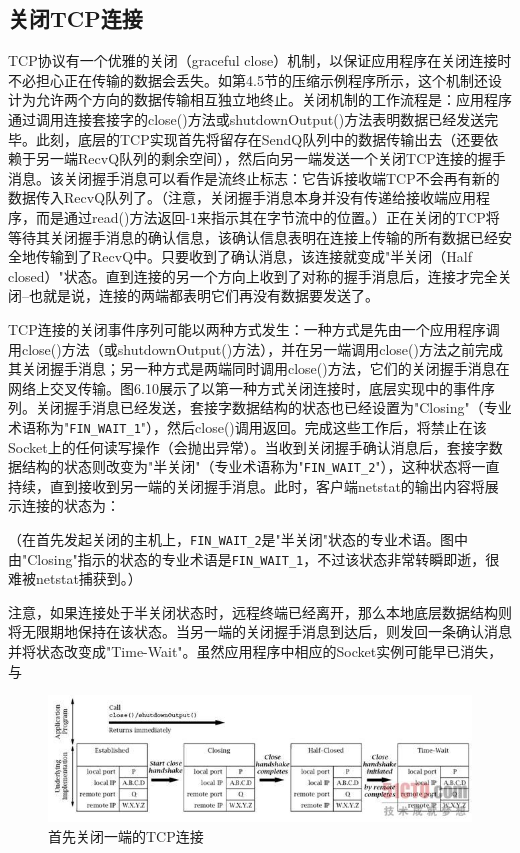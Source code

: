 	\subsection{关闭TCP连接}

		TCP协议有一个优雅的关闭（graceful close）机制，以保证应用程序在关闭连接时不必担心正在传输的数据会丢失。如第4.5节的压缩示例程序所示，这个机制还设计为允许两个方向的数据传输相互独立地终止。关闭机制的工作流程是：应用程序通过调用连接套接字的close()方法或shutdownOutput()方法表明数据已经发送完毕。此刻，底层的TCP实现首先将留存在SendQ队列中的数据传输出去（还要依赖于另一端RecvQ队列的剩余空间），然后向另一端发送一个关闭TCP连接的握手消息。该关闭握手消息可以看作是流终止标志：它告诉接收端TCP不会再有新的数据传入RecvQ队列了。（注意，关闭握手消息本身并没有传递给接收端应用程序，而是通过read()方法返回-1来指示其在字节流中的位置。）正在关闭的TCP将等待其关闭握手消息的确认信息，该确认信息表明在连接上传输的所有数据已经安全地传输到了RecvQ中。只要收到了确认消息，该连接就变成"半关闭（Half closed）"状态。直到连接的另一个方向上收到了对称的握手消息后，连接才完全关闭--也就是说，连接的两端都表明它们再没有数据要发送了。

		TCP连接的关闭事件序列可能以两种方式发生：一种方式是先由一个应用程序调用close()方法（或shutdownOutput()方法），并在另一端调用close()方法之前完成其关闭握手消息；另一种方式是两端同时调用close()方法，它们的关闭握手消息在网络上交叉传输。图6.10展示了以第一种方式关闭连接时，底层实现中的事件序列。关闭握手消息已经发送，套接字数据结构的状态也已经设置为"Closing"（专业术语称为"\verb|FIN_WAIT_1|"），然后close()调用返回。完成这些工作后，将禁止在该Socket上的任何读写操作（会抛出异常）。当收到关闭握手确认消息后，套接字数据结构的状态则改变为"半关闭"（专业术语称为"\verb|FIN_WAIT_2|"），这种状态将一直持续，直到接收到另一端的关闭握手消息。此时，客户端netstat的输出内容将展示连接的状态为：

		

		（在首先发起关闭的主机上，\verb|FIN_WAIT_2|是"半关闭"状态的专业术语。图中由"Closing"指示的状态的专业术语是\verb|FIN_WAIT_1|，不过该状态非常转瞬即逝，很难被netstat捕获到。）

		注意，如果连接处于半关闭状态时，远程终端已经离开，那么本地底层数据结构则将无限期地保持在该状态。当另一端的关闭握手消息到达后，则发回一条确认消息并将状态改变成"Time-Wait"。虽然应用程序中相应的Socket实例可能早已消失，与


		\clearpage

		\begin{figure}[htbp]%
			\centering
			\includegraphics[scale=.6]{img/06.10.jpg}
			\caption{首先关闭一端的TCP连接}
			\label{fig:close.one.side.tcp}
		\end{figure}

